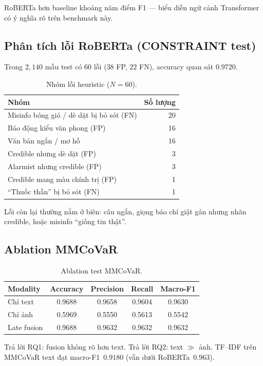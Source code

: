 \documentclass[12pt, a4paper]{report}
\begin{document}
RoBERTa hơn baseline khoảng năm điểm F1 --- biểu diễn ngữ cảnh Transformer có ý nghĩa rõ trên benchmark này.

\subsection{Phân tích lỗi RoBERTa (CONSTRAINT test)}

Trong $2{,}140$ mẫu test có $60$ lỗi ($38$ FP, $22$ FN), accuracy quan sát $0.9720$.

\begin{table}[htbp]
\centering
\caption{Nhóm lỗi heuristic ($N=60$).}
\label{tab:error-cats}
\begin{tabular}{lr}
\hline
Nhóm & Số lượng \\
\hline
Misinfo bóng gió / dè dặt bị bỏ sót (FN) & 20 \\
Báo động kiểu văn phong (FP) & 16 \\
Văn bản ngắn / mơ hồ & 16 \\
Credible nhưng dè dặt (FP) & 3 \\
Alarmist nhưng credible (FP) & 3 \\
Credible mang màu chính trị (FP) & 1 \\
``Thuốc thần'' bị bỏ sót (FN) & 1 \\
\hline
\end{tabular}
\end{table}

Lỗi còn lại thường nằm ở biên: câu ngắn, giọng báo chí giật gân nhưng nhãn credible, hoặc misinfo ``giống tin thật''.

\subsection{Ablation MMCoVaR}

\begin{table}[htbp]
\centering
\caption{Ablation test MMCoVaR.}
\label{tab:ablation}
\begin{tabular}{lcccc}
\hline
Modality & Accuracy & Precision & Recall & Macro-F1 \\
\hline
Chỉ text & 0.9688 & 0.9658 & 0.9604 & 0.9630 \\
Chỉ ảnh & 0.5969 & 0.5550 & 0.5613 & 0.5542 \\
Late fusion & 0.9688 & 0.9632 & 0.9632 & 0.9632 \\
\hline
\end{tabular}
\end{table}

Trả lời RQ1: fusion không rõ hơn text.
Trả lời RQ2: text $\gg$ ảnh.
TF--IDF trên MMCoVaR text đạt macro-F1~$0.9180$ (vẫn dưới RoBERTa~$0.963$).
\end{document}
